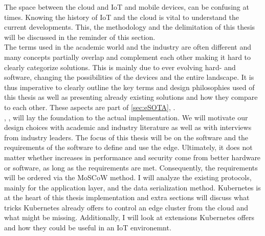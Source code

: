 {The space between the cloud and IoT and mobile devices, can be confusing at times. Knowing the history of IoT and the cloud is vital to understand the current developments. This, the methodology and the delimitation of this thesis will be discussed in the reminder of this section.\\




The terms used in the academic world and the industry are often different and many concepts partially overlap and complement each other making it hard to clearly categorize solutions. This is mainly due to ever evolving hard- and software, changing the possibilities of the devices and the entire landscape. It is thus imperative to clearly outline the key terms and design philosophies used of this thesis as well as presenting already existing solutions and how they compare to each other. These aspects are part of \cref{sec:eSOTA}, .\\
, , will lay the foundation to the actual implementation. We will motivate our design choices with academic and industry literature as well as with interviews from industry leaders. The focus of this thesis will be on the software and the requirements of the software to define and use the edge. Ultimately, it does not matter whether increases in performance and security come from better hardware or software, as long as the requirements are met. Consequently, the requirements will be ordered via the MoSCoW method. I will analyze the existing protocols, mainly for the application layer, and the data serialization method. Kubernetes is at the heart of this thesis implementation and extra sections will discuss what tricks Kubernetes already offers to control an edge cluster from the cloud and what might be missing. Additionally, I will look at extensions Kubernetes offers and how they could be useful in an IoT environemnt.\\


}


